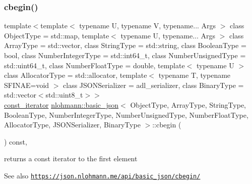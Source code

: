 \subsubsection{\texorpdfstring{cbegin()}{cbegin()}}
{\footnotesize\ttfamily template$<$template$<$ typename U, typename V, typename... Args $>$ class Object\+Type = std\+::map, template$<$ typename U, typename... Args $>$ class Array\+Type = std\+::vector, class String\+Type  = std\+::string, class Boolean\+Type  = bool, class Number\+Integer\+Type  = std\+::int64\+\_\+t, class Number\+Unsigned\+Type  = std\+::uint64\+\_\+t, class Number\+Float\+Type  = double, template$<$ typename U $>$ class Allocator\+Type = std\+::allocator, template$<$ typename T, typename S\+F\+I\+N\+A\+E=void $>$ class J\+S\+O\+N\+Serializer = adl\+\_\+serializer, class Binary\+Type  = std\+::vector$<$std\+::uint8\+\_\+t$>$$>$ \\
\hyperlink{classnlohmann_1_1basic__json_aebd2cfa7e4ded4e97cde9269bfeeea38}{const\+\_\+iterator} \hyperlink{classnlohmann_1_1basic__json}{nlohmann\+::basic\+\_\+json}$<$ Object\+Type, Array\+Type, String\+Type, Boolean\+Type, Number\+Integer\+Type, Number\+Unsigned\+Type, Number\+Float\+Type, Allocator\+Type, J\+S\+O\+N\+Serializer, Binary\+Type $>$\+::cbegin (\begin{DoxyParamCaption}{ }\end{DoxyParamCaption}) const\hspace{0.3cm}{\ttfamily [inline]}, {\ttfamily [noexcept]}}



returns a const iterator to the first element 

\begin{DoxySeeAlso}{See also}
\href{https://json.nlohmann.me/api/basic_json/cbegin/}{\tt https\+://json.\+nlohmann.\+me/api/basic\+\_\+json/cbegin/} 
\end{DoxySeeAlso}
\mbox{\label{classnlohmann_1_1basic__json_a3017cf0f1a4673e904e34cfef62e7758}} 

